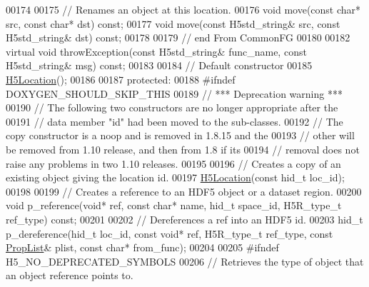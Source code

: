 \begin{DoxyCode}
00174 
00175         \textcolor{comment}{// Renames an object at this location.}
00176         \textcolor{keywordtype}{void} move(\textcolor{keyword}{const} \textcolor{keywordtype}{char}* src, \textcolor{keyword}{const} \textcolor{keywordtype}{char}* dst) \textcolor{keyword}{const};
00177         \textcolor{keywordtype}{void} move(\textcolor{keyword}{const} H5std\_string& src, \textcolor{keyword}{const} H5std\_string& dst) \textcolor{keyword}{const};
00178 
00179 \textcolor{comment}{// end From CommonFG}
00180 
00182         \textcolor{keyword}{virtual} \textcolor{keywordtype}{void} throwException(\textcolor{keyword}{const} H5std\_string& func\_name, \textcolor{keyword}{const} H5std\_string& msg) \textcolor{keyword}{const};
00183 
00184         \textcolor{comment}{// Default constructor}
00185         \hyperlink{class_h5_1_1_h5_location}{H5Location}();
00186 
00187    \textcolor{keyword}{protected}:
00188 \textcolor{preprocessor}{#ifndef DOXYGEN\_SHOULD\_SKIP\_THIS}
00189         \textcolor{comment}{// *** Deprecation warning ***}
00190         \textcolor{comment}{// The following two constructors are no longer appropriate after the}
00191         \textcolor{comment}{// data member "id" had been moved to the sub-classes.}
00192         \textcolor{comment}{// The copy constructor is a noop and is removed in 1.8.15 and the}
00193         \textcolor{comment}{// other will be removed from 1.10 release, and then from 1.8 if its}
00194         \textcolor{comment}{// removal does not raise any problems in two 1.10 releases.}
00195 
00196         \textcolor{comment}{// Creates a copy of an existing object giving the location id.}
00197         \hyperlink{class_h5_1_1_h5_location}{H5Location}(\textcolor{keyword}{const} hid\_t loc\_id);
00198 
00199         \textcolor{comment}{// Creates a reference to an HDF5 object or a dataset region.}
00200         \textcolor{keywordtype}{void} p\_reference(\textcolor{keywordtype}{void}* ref, \textcolor{keyword}{const} \textcolor{keywordtype}{char}* name, hid\_t space\_id, H5R\_type\_t ref\_type) \textcolor{keyword}{const};
00201 
00202         \textcolor{comment}{// Dereferences a ref into an HDF5 id.}
00203         hid\_t p\_dereference(hid\_t loc\_id, \textcolor{keyword}{const} \textcolor{keywordtype}{void}* ref, H5R\_type\_t ref\_type, \textcolor{keyword}{const} 
      \hyperlink{class_h5_1_1_prop_list}{PropList}& plist, \textcolor{keyword}{const} \textcolor{keywordtype}{char}* from\_func);
00204 
00205 \textcolor{preprocessor}{#ifndef H5\_NO\_DEPRECATED\_SYMBOLS}
00206         \textcolor{comment}{// Retrieves the type of object that an object reference points to.}

\end{DoxyCode}
